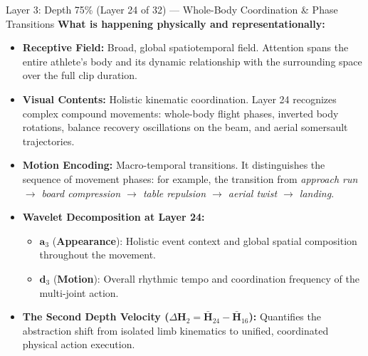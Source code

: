 \documentclass[a4paper, 11pt]{article}
\begin{document}
\begin{layerbox}{Layer 3: Depth 75\% (Layer 24 of 32) --- Whole-Body Coordination \& Phase Transitions}
\textbf{What is happening physically and representationally:}
\begin{itemize}
    \item \textbf{Receptive Field:} Broad, global spatiotemporal field. Attention spans the entire athlete's body and its dynamic relationship with the surrounding space over the full clip duration.
    \item \textbf{Visual Contents:} Holistic kinematic coordination. Layer 24 recognizes complex compound movements: whole-body flight phases, inverted body rotations, balance recovery oscillations on the beam, and aerial somersault trajectories.
    \item \textbf{Motion Encoding:} Macro-temporal transitions. It distinguishes the sequence of movement phases: for example, the transition from \emph{approach run $\rightarrow$ board compression $\rightarrow$ table repulsion $\rightarrow$ aerial twist $\rightarrow$ landing}.
    \item \textbf{Wavelet Decomposition at Layer 24:}
    \begin{itemize}
        \item $\mathbf{a}_3$ (\textbf{Appearance}): Holistic event context and global spatial composition throughout the movement.
        \item $\mathbf{d}_3$ (\textbf{Motion}): Overall rhythmic tempo and coordination frequency of the multi-joint action.
    \end{itemize}
    \item \textbf{The Second Depth Velocity ($\Delta\mathbf{H}_2 = \bar{\mathbf{H}}_{24} - \bar{\mathbf{H}}_{16}$):}
    Quantifies the abstraction shift from isolated limb kinematics to unified, coordinated physical action execution.
\end{itemize}
\end{layerbox}

\vspace{0.3cm}
\end{document}
